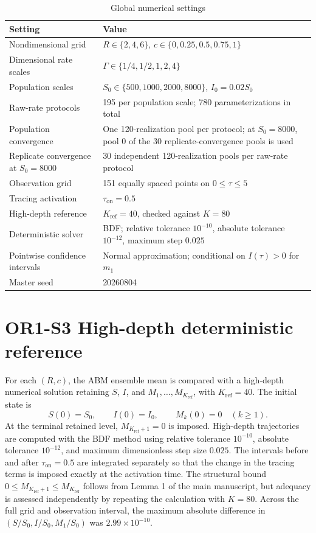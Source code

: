 \documentclass[11pt]{article}
\begin{document}
\begin{table}[H]
\caption{Global numerical settings}
\centering\small
\begin{tabularx}{\textwidth}{@{}p{}X@{}}
\toprule
Setting & Value \\
\midrule
Nondimensional grid & $R\in\{2,4,6\}$, $c\in\{0,0.25,0.5,0.75,1\}$ \\
Dimensional rate scales & $\Gamma\in\{1/4,1/2,1,2,4\}$ \\
Population scales & $S_0\in\{500,1000,2000,8000\}$, $I_0=0.02S_0$ \\
Raw-rate protocols & 195 per population scale; 780 parameterizations in total \\
Population convergence & One 120-realization pool per protocol; at $S_0=8000$, pool 0 of the 30 replicate-convergence pools is used \\
Replicate convergence at $S_0=8000$ & 30 independent 120-realization pools per raw-rate protocol \\
Observation grid & 151 equally spaced points on $0\leq\tau\leq5$ \\
Tracing activation & $\tau_{\mathrm{on}}=0.5$ \\
High-depth reference & $K_{\mathrm{ref}}=40$, checked against $K=80$ \\
Deterministic solver & BDF; relative tolerance $10^{-10}$, absolute tolerance $10^{-12}$, maximum step $0.025$ \\
Pointwise confidence intervals & Normal approximation; conditional on $I(\tau)>0$ for $m_1$ \\
Master seed & 20260804 \\
\bottomrule
\end{tabularx}
\end{table}

\section*{OR1-S3 High-depth deterministic reference}
For each $(R,c)$, the ABM ensemble mean is compared with a high-depth numerical solution retaining $S$, $I$, and $M_1,\ldots,M_{K_{\mathrm{ref}}}$, with $K_{\mathrm{ref}}=40$. The initial state is
\[
S(0)=S_0,\qquad I(0)=I_0,\qquad M_k(0)=0\quad(k\geq1).
\]
At the terminal retained level, $M_{K_{\mathrm{ref}}+1}=0$ is imposed. High-depth trajectories are computed with the BDF method using relative tolerance $10^{-10}$, absolute tolerance $10^{-12}$, and maximum dimensionless step size $0.025$. The intervals before and after $\tau_{\mathrm{on}}=0.5$ are integrated separately so that the change in the tracing terms is imposed exactly at the activation time. The structural bound $0\leq M_{K_{\mathrm{ref}}+1}\leq M_{K_{\mathrm{ref}}}$ follows from Lemma 1 of the main manuscript, but adequacy is assessed independently by repeating the calculation with $K=80$. Across the full grid and observation interval, the maximum absolute difference in $(S/S_0,I/S_0,M_1/S_0)$ was $2.99\times10^{-10}$.
\end{document}
